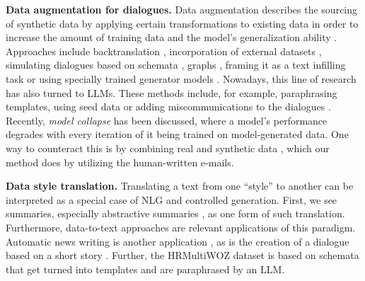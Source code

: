\textbf{Data augmentation for dialogues.}
Data augmentation describes the sourcing of synthetic data by applying certain transformations to existing data in order to increase the amount of training data and the model's generalization ability \cite{shortenTextDataAugmentation2021}.
Approaches include backtranslation \cite{kulhanekAuGPTAuxiliaryTasks2021}, incorporation of external datasets \cite{xu-etal-2021-caire}, simulating dialogues based on schemata \cite{pengSYNERGYBuildingTask2021}, graphs \cite{grittaConversationGraphData2021}, framing it as a text infilling task \cite{axmanContextualDataAugmentation} or using specially trained generator models \cite{steindl-etal-2023-controlled}.
Nowadays, this line of research has also turned to LLMs.
These methods include, for example, paraphrasing templates, using seed data or adding miscommunications to the dialogues
\cite{liControllableDialogueSimulation2022,kulkarni2024synthdst, chenPLACESPromptingLanguage2023, mehriLADLanguageModels2022, steindl-etal-2025-coprus}.
Recently, \textit{model collapse} \cite{shumailovAIModelsCollapse2024} has been discussed, where a model's performance degrades with every iteration of it being trained on model-generated data. 
One way to counteract this is by combining real and synthetic data \cite{gerstgrasserModelCollapseInevitable2024}, which our method does by utilizing the human-written e-mails.

\textbf{Data style translation.}
Translating a text from one ``style'' to another can be interpreted as a special case of NLG and controlled generation.
First, we see summaries, especially abstractive summaries \cite{GUPTA201949}, as one form of such translation.
Furthermore, data-to-text approaches \cite{jagfeldSequencetoSequenceModelsDatatoText2018, sharmaInnovationsNeuralDatatotext2023, wangEvaluatingTextGeneration2021} are relevant applications of this paradigm.
Automatic news writing is another application \cite{Diakopoulos+2019}, as is 
the creation of a dialogue based on a short story \cite{miyazakiDialogueGenerationConditional2023a}.
Further, the HR\-MultiWOZ \cite{xu-etal-2024-hr} dataset is based on schemata that get turned into templates and are paraphrased by an LLM\@.


